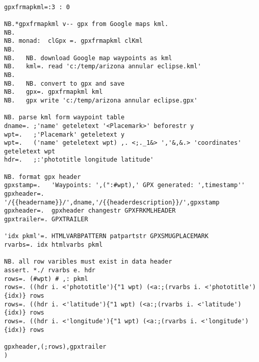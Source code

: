 \begin{tcolorbox}[breakable, size=fbox, boxrule=1pt, pad at break*=1mm,colback=cellbackground, colframe=cellborder]
\begin{lstlisting}[language=jdoc, frame=single,framerule=0pt,label=lst:scr2767X0]

gpxfrmapkml=:3 : 0

NB.*gpxfrmapkml v-- gpx from Google maps kml.
NB.
NB. monad:  clGpx =. gpxfrmapkml clKml
NB.
NB.   NB. download Google map waypoints as kml
NB.   kml=. read 'c:/temp/arizona annular eclipse.kml'
NB.
NB.   NB. convert to gpx and save
NB.   gpx=. gpxfrmapkml kml
NB.   gpx write 'c:/temp/arizona annular eclipse.gpx'  

NB. parse kml form waypoint table
dname=. ;'name' geteletext '<Placemark>' beforestr y
wpt=.   ;'Placemark' geteletext y
wpt=.   ('name' geteletext wpt) ,. <;._1&> ','&,&.> 'coordinates' geteletext wpt
hdr=.   ;:'phototitle longitude latitude'

NB. format gpx header 
gpxstamp=.   'Waypoints: ',(":#wpt),' GPX generated: ',timestamp''
gpxheader=.  '/{{headername}}/',dname,'/{{headerdescription}}/',gpxstamp
gpxheader=.  gpxheader changestr GPXFRKMLHEADER
gpxtrailer=. GPXTRAILER

'idx pkml'=. HTMLVARBPATTERN patpartstr GPXSMUGPLACEMARK
rvarbs=. idx htmlvarbs pkml

NB. all row varibles must exist in data header
assert. *./ rvarbs e. hdr
rows=. (#wpt) # ,: pkml
rows=. ((hdr i. <'phototitle'){"1 wpt) (<a:;(rvarbs i. <'phototitle'){idx)} rows
rows=. ((hdr i. <'latitude'){"1 wpt) (<a:;(rvarbs i. <'latitude'){idx)} rows
rows=. ((hdr i. <'longitude'){"1 wpt) (<a:;(rvarbs i. <'longitude'){idx)} rows

gpxheader,(;rows),gpxtrailer
)
\end{lstlisting}
\end{tcolorbox}





%